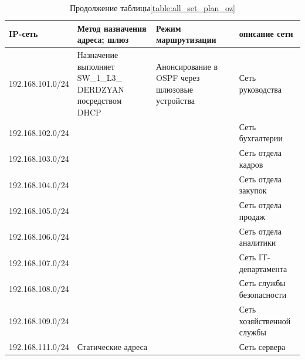 \begin{table}[H]
\centering
{}
\caption{Продолжение таблицы\;\ref{table:all_set_plan_oz}}
\small
\begin{tabularx}{\textwidth}{|X|X|X|X|}
	\hline
	IP-сеть				&	Метод назначения адреса; шлюз	&	Режим маршрутизации	& описание сети	\\ 
	\hline
	192.168.101.0/24 	& Назначение выполняет SW\_1\_L3\_ DERDZYAN посредством DHCP & Анонсирование в OSPF через шлюзовые устройства	& Сеть руководства \\
	\cline{1-1}\cline{4-4}
	192.168.102.0/24	& &  & Сеть бухгалтерии\\
	\cline{1-1}\cline{4-4}
	192.168.103.0/24	& &  & Сеть отдела кадров\\
	\cline{1-1}\cline{4-4}
	192.168.104.0/24	& &  & Сеть отдела закупок\\
	\cline{1-1}\cline{4-4}
	192.168.105.0/24	& &  & Сеть отдела продаж\\
	\cline{1-1}\cline{4-4}
	192.168.106.0/24	& &  & Сеть отдела аналитики \\
	\cline{1-1}\cline{4-4}
	192.168.107.0/24	& &  & Сеть IT-департамента \\
	\cline{1-1}\cline{4-4}
	192.168.108.0/24	& &  & Сеть службы безопасности \\
	\cline{1-1}\cline{4-4}
	192.168.109.0/24	& &  & Сеть хозяйственной службы \\
	\cline{1-2}\cline{4-4}
	192.168.111.0/24	& Статические адреса &  & Сеть сервера\\
	\hline
\end{tabularx}
\end{table}

